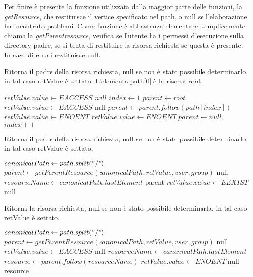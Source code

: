 Per finire è presente la funzione utilizzata dalla maggior parte delle funzioni, la \emph{getResource}, che restituisce il vertice specificato nel path, o null se l'elaborazione ha incontrato problemi. Come funzione è abbastanza elementare, semplicemente chiama la \emph{getParentresource}, verifica se l'utente ha i permessi d'esecuzione sulla directory padre, se si tenta di restituire la risorsa richiesta se questa è presente. In caso di errori restituisce null.

\begin{algorithm}
\caption{Ritorna il padre della risorsa richiesta, null se non è stato possibile determinarlo, in tal caso retValue è settato. L'elemento path[0] è la risorsa root.}
\begin{algorithmic}
		\State $retValue.value \gets EACCESS$
		\State \Return $null$
	\EndIf
	\State $index \gets 1$
	\State $parent \gets root$
			\State $retValue.value \gets EACCESS$
			\State \Return null
		\EndIf
		\State $parent \gets parent.follow(path[index])$
			\State $retValue.value \gets ENOENT$
			\State $retValue.value \gets ENOENT$
			\State $parent \gets null$
		\EndIf
		\State $index++$
	\EndWhile
\EndFunction
\end{algorithmic}
\end{algorithm}
\begin{algorithm}
\caption{Ritorna il padre della risorsa richiesta, null se non è stato possibile determinarlo, in tal caso retValue è settato.}
\begin{algorithmic}
	\State $canonicalPath \gets path.split("/")$
	\State $parent \gets getParentResource(canonicalPath, retValue, user, group)$
		\State \Return null
	\EndIf
	\State $resourceName \gets canonicalPath.lastElement$
		\State \Return parent
	\EndIf
	\State $retValue.value \gets EEXIST$
	\State \Return null
\EndFunction
\end{algorithmic}
\end{algorithm}
\begin{algorithm}
\begin{algorithmic}
\caption{Ritorna la risorsa richiesta, null se non è stato possibile determinarla, in tal caso retValue è settato.}
	\State $canonicalPath \gets path.split("/")$
	\State $parent \gets getParentResource(canonicalPath, retValue, user, group)$
		\State \Return null
	\EndIf
	\State $retValue.value \gets EACCESS$
		\State \Return null
	\EndIf
	\State $resourceName \gets canonicalPath.lastElement$
	\State $resource \gets parent.follow(resourceName)$
		\State $retValue.value \gets ENOENT$
		\State \Return null
	\EndIf
	\State \Return resource
\EndFunction
\end{algorithmic}
\end{algorithm}

